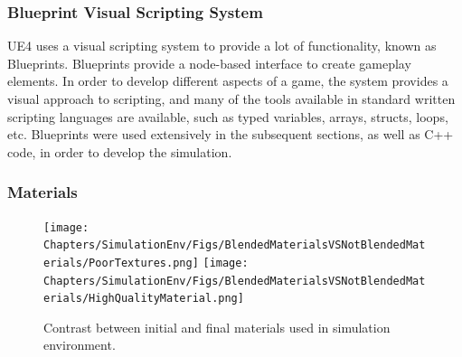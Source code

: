 
\subsubsection{Blueprint Visual Scripting System}
UE4 uses a visual scripting system to provide a lot of functionality, known as Blueprints. Blueprints provide a node-based interface to create gameplay elements. In order to develop different aspects of a game, the system provides a visual approach to scripting, and many of the tools available in standard written scripting languages are available, such as typed variables, arrays, structs, loops, etc. Blueprints were used extensively in the subsequent sections, as well as C++ code, in order to develop the simulation.


\subsubsection{Materials}


\begin{figure}
    \centering
    \texttt{[image: Chapters/SimulationEnv/Figs/BlendedMaterialsVSNotBlendedMaterials/PoorTextures.png]}
    \label{fig:PoorTextures}
    \texttt{[image: Chapters/SimulationEnv/Figs/BlendedMaterialsVSNotBlendedMaterials/HighQualityMaterial.png]}
    \label{fig:GoodTextures}
    \caption{Contrast between initial and final materials used in simulation environment.}
\end{figure}

